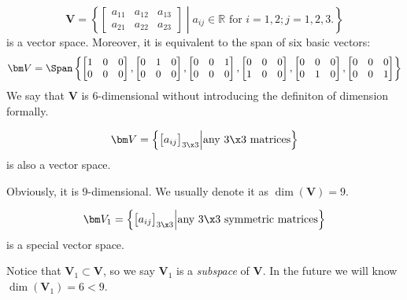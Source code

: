 \begin{example}
\[
\bm V = \left\{\begin{bmatrix}
a_{11}&a_{12}&a_{13}\\a_{21}&a_{22}&a_{23}
\end{bmatrix}\middle| a_{ij}\in\mathbb{R}\text{ for $i=1,2; j=1,2,3.$}\right\}
\] 
is a vector space. Moreover, it is equivalent to the span of six basic vectors:
\[
\bm V = \Span\left\{
\begin{bmatrix}
1&0&0\\0&0&0
\end{bmatrix},\begin{bmatrix}
0&1&0\\0&0&0
\end{bmatrix},\begin{bmatrix}
0&0&1\\0&0&0
\end{bmatrix},\begin{bmatrix}
0&0&0\\1&0&0
\end{bmatrix},\begin{bmatrix}
0&0&0\\0&1&0
\end{bmatrix},\begin{bmatrix}
0&0&0\\0&0&1
\end{bmatrix}
\right\}
\]
We say that $\bm V$ is 6-dimensional without introducing the definiton of dimension formally.
\end{example}
\begin{example}
\[
\bm V = \left\{\begin{bmatrix}
a_{ij}
\end{bmatrix}_{3\x 3}\middle| \text{any $3\x 3$ matrices}\right\}
\]
 is also a vector space.
 
Obviously, it is 9-dimensional. We usually denote it as $\dim(\bm V) = 9$.

\[\bm V_1 = \left\{\begin{bmatrix}
a_{ij}
\end{bmatrix}_{3\x 3}\middle| \text{any $3\x 3$ symmetric matrices}\right\}
\] 
is a special vector space.

Notice that $\bm V_1\subset\bm V$, so we say $\bm V_1$ is a \textit{subspace} of $\bm V$. In the future we will know $\dim(\bm V_1) = 6<9$.
\end{example}
